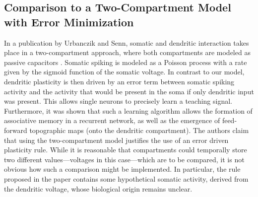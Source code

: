 \documentclass[10pt,a4paper,draft]{article}
\begin{document}
\subsection{Comparison to a Two-Compartment Model with Error Minimization}
In a publication by Urbanczik and Senn, somatic and dendritic interaction takes place in a two-compartment approach, where both compartments are modeled as passive capacitors \cite{Urbanczik_2014}. Somatic spiking is modeled as a Poisson process with a rate given by the sigmoid function of the somatic voltage. In contrast to our model, dendritic plasticity is then driven by an error term between somatic spiking activity and the activity that would be present in the soma if only dendritic input was present. This allows single neurons to precisely learn a teaching signal. Furthermore, it was shown that such a learning algorithm allows the formation of associative memory in a recurrent network, as well as the emergence of feed-forward topographic maps (onto the dendritic compartment). The authors claim that using the two-compartment model justifies the use of an error driven plasticity rule. While it is reasonable that compartments could temporally store two different values---voltages in this case---which are to be compared, it is not obvious how such a comparison might be implemented. In particular, the rule proposed in the paper contains some hypothetical somatic activity, derived from the dendritic voltage, whose biological origin remains unclear.



%
%
\end{document}
